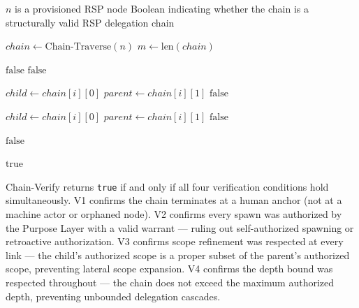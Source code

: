 \begin{algorithm}
\caption{Chain-Verify($n$) — Verify the authorization chain from node $n$ to human anchor}
\label{alg:chain-verify}
\begin{algorithmic}[1]
\REQUIRE $n$ is a provisioned RSP node
\ENSURE Boolean indicating whether the chain is a structurally valid RSP delegation chain

\STATE $chain \leftarrow \text{Chain-Traverse}(n)$
\STATE $m \leftarrow \text{len}(chain)$

\STATE {}
    \STATE \RETURN $\text{false}$ 
\ENDIF
{}
    \STATE \RETURN $\text{false}$ 
\ENDIF

\STATE {}
    \STATE $child \leftarrow chain[i][0]$
    \STATE $parent \leftarrow chain[i][1]$
        \STATE \RETURN $\text{false}$ 
    \ENDIF
\ENDFOR

\STATE {}
    \STATE $child \leftarrow chain[i][0]$
    \STATE $parent \leftarrow chain[i][1]$
        \STATE \RETURN $\text{false}$ 
    \ENDIF
\ENDFOR

\STATE {}
        \STATE \RETURN $\text{false}$ 
    \ENDIF
\ENDFOR

\RETURN $\text{true}$
\end{algorithmic}
\end{algorithm}

Chain-Verify returns \texttt{true} if and only if all four verification conditions hold simultaneously. V1 confirms the chain terminates at a human anchor (not at a machine actor or orphaned node). V2 confirms every spawn was authorized by the Purpose Layer with a valid warrant — ruling out self-authorized spawning or retroactive authorization. V3 confirms scope refinement was respected at every link — the child's authorized scope is a proper subset of the parent's authorized scope, preventing lateral scope expansion. V4 confirms the depth bound was respected throughout — the chain does not exceed the maximum authorized depth, preventing unbounded delegation cascades.

